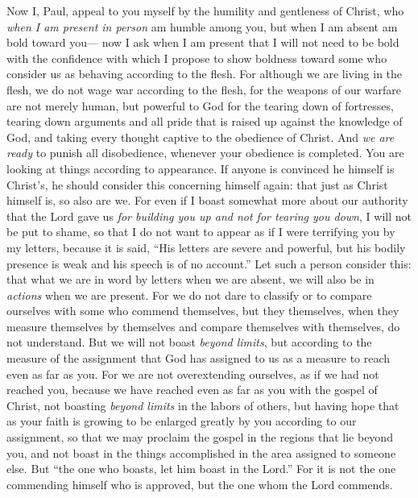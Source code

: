 \begin{biblechapter} %
 Now I, Paul, appeal to you myself by the humility and gentleness of Christ, who \textit{when I am present in person} am humble among you, but when I am absent am bold toward you—
\verse now I ask when I am present that I will not need to be bold with the confidence with which I propose to show boldness toward some who consider us as behaving according to the flesh.
\verse For although we are living in the flesh, we do not wage war according to the flesh,
\verse for the weapons of our warfare are not merely human, but powerful to God for the tearing down of fortresses, tearing down arguments
\verse and all pride that is raised up against the knowledge of God, and taking every thought captive to the obedience of Christ.
\verse And \textit{we are ready} to punish all disobedience, whenever your obedience is completed.
\verse You are looking at things according to appearance. If anyone is convinced he himself is Christ’s, he should consider this concerning himself again: that just as Christ himself is, so also are we.
\verse For even if I boast somewhat more about our authority that the Lord gave us \textit{for building you up and not for tearing you down}, I will not be put to shame,
\verse so that I do not want to appear as if I were terrifying you by my letters,
\verse because it is said, “His letters are severe and powerful, but his bodily presence is weak and his speech is of no account.”
\verse Let such a person consider this: that what we are in word by letters when we are absent, we will also be in \textit{actions} when we are present.
\verse For we do not dare to classify or to compare ourselves with some who commend themselves, but they themselves, when they measure themselves by themselves and compare themselves with themselves, do not understand.
\verse But we will not boast \textit{beyond limits}, but according to the measure of the assignment that God has assigned to us as a measure to reach even as far as you.
\verse For we are not overextending ourselves, as if we had not reached you, because we have reached even as far as you with the gospel of Christ,
\verse not boasting \textit{beyond limits} in the labors of others, but having hope that as your faith is growing to be enlarged greatly by you according to our assignment,
\verse so that we may proclaim the gospel in the regions that lie beyond you, and not boast in the things accomplished in the area assigned to someone else.
\verse But “the one who boasts, let him boast in the Lord.”
\verse For it is not the one commending himself who is approved, but the one whom the Lord commends.
\end{biblechapter}

